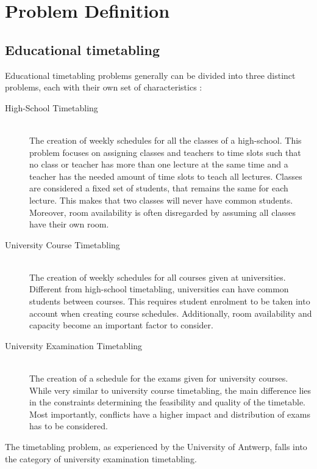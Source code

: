 
\section{Problem Definition}\label{sec:problem}

\subsection{Educational timetabling}
Educational timetabling problems generally can be divided into three distinct problems, each with their own set of characteristics \cite{schaerf1996, kingston2013}:

\begin{description}
   \item [High-School Timetabling] \hfill \\ The creation of weekly schedules for all the classes of a high-school. This problem focuses on assigning classes and teachers to time slots such that no class or teacher has more than one lecture at the same time and a teacher has the needed amount of time slots to teach all lectures. Classes are considered a fixed set of students, that remains the same for each lecture. This makes that two classes will never have common students. Moreover, room availability is often disregarded by assuming all classes have their own room.
   \item [University Course Timetabling] \hfill \\ The creation of weekly schedules for all courses given at universities. Different from high-school timetabling, universities can have common students between courses. This requires student enrolment to be taken into account when creating course schedules. Additionally, room availability and capacity become an important factor to consider.
   \item [University Examination Timetabling] \hfill \\ The creation of a schedule for the exams given for university courses. While very similar to university course timetabling, the main difference lies in the constraints determining the feasibility and quality of the timetable. Most importantly, conflicts have a higher impact and distribution of exams has to be considered.
\end{description}

The timetabling problem, as experienced by the University of Antwerp, falls into the category of university examination timetabling. 

